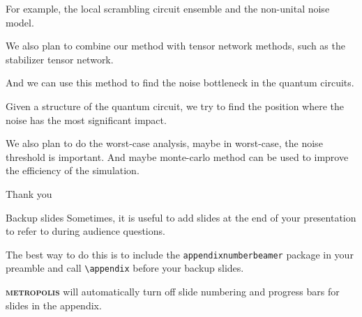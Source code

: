 \documentclass[10pt]{beamer}
\newcommand{\themename}{\textbf{\textsc{metropolis}}\xspace}
\begin{document}
\begin{CJK}{UTF8}{gbsn}
{  For example, the local scrambling circuit ensemble and the non-unital noise model.

  We also plan to combine our method with tensor network methods, such as the stabilizer tensor network.

  And we can use this method to find the noise bottleneck in the quantum circuits.

  Given a structure of the quantum circuit, we try to find the position where the noise has the most significant impact.

  We also plan to do the worst-case analysis, maybe in worst-case, the noise threshold is important. And maybe monte-carlo method can be used to improve the efficiency of the simulation. 
}

\begin{frame}[standout]
 Thank you\\
\end{frame}
\appendix

\begin{frame}[fragile]{Backup slides}
 Sometimes, it is useful to add slides at the end of your presentation to
 refer to during audience questions.

 The best way to do this is to include the \verb|appendixnumberbeamer|
 package in your preamble and call \verb|\appendix| before your backup slides.

  \themename will automatically turn off slide numbering and progress bars for
 slides in the appendix.%
\end{frame}



\end{CJK}
\end{document}
